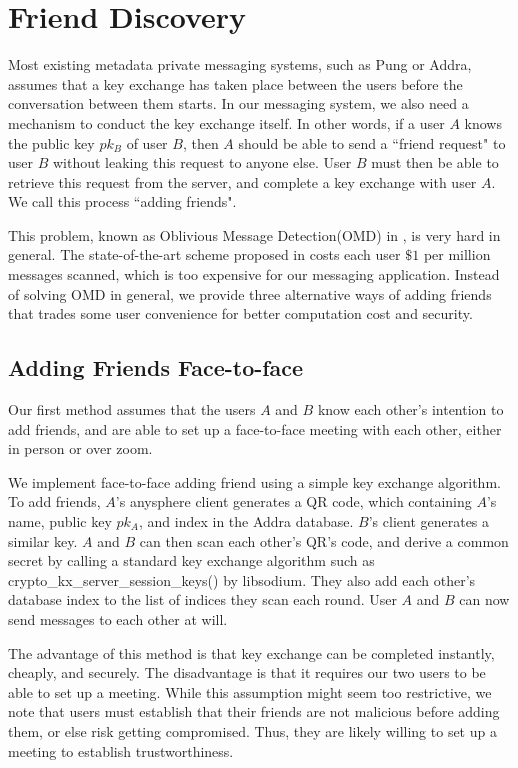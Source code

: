 \section{Friend Discovery}

Most existing metadata private messaging systems, such as Pung or Addra, assumes that a key exchange has taken place between the users before the conversation between them starts. In our messaging system, we also need a mechanism to conduct the key exchange itself. In other words, if a user $A$ knows the public key $pk_B$ of user $B$, then $A$ should be able to send a ``friend request" to user $B$ without leaking this request to anyone else. User $B$ must then be able to retrieve this request from the server, and complete a key exchange with user $A$. We call this process ``adding friends".

This problem, known as Oblivious Message Detection(OMD) in \cite{liutromer2021}, is very hard in general. The state-of-the-art scheme proposed in \cite{liutromer2021} costs each user $\$ 1$ per million messages scanned, which is too expensive for our messaging application. Instead of solving OMD in general, we provide three alternative ways of adding friends that trades some user convenience for better computation cost and security.

\subsection{Adding Friends Face-to-face}
Our first method assumes that the users $A$ and $B$ know each other's intention to add friends, and are able to set up a face-to-face meeting with each other, either in person or over zoom. 

We implement face-to-face adding friend using a simple key exchange algorithm. To add friends, $A$'s anysphere client generates a QR code, which containing $A$'s name, public key $pk_A$, and index in the Addra database. $B$'s client generates a similar key. $A$ and $B$ can then scan each other's QR's code,  and derive a common secret by calling a standard key exchange algorithm such as crypto\_kx\_server\_session\_keys()  by libsodium. They also add each other's database index to the list of indices they scan each round. User $A$ and $B$ can now send messages to each other at will.

The advantage of this method is that key exchange can be completed instantly, cheaply, and securely. The disadvantage is that it requires our two users to be able to set up a meeting. While this assumption might seem too restrictive, we note that users must establish that their friends are not malicious before adding them, or else risk getting compromised. Thus, they are likely willing to set up a meeting to establish trustworthiness. 

